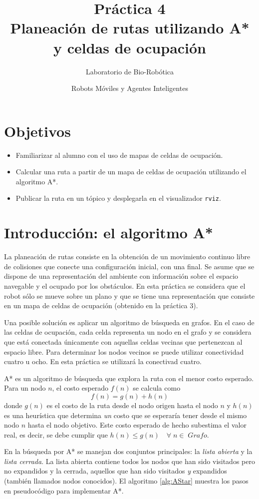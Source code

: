 \documentclass[letterpaper,12pt]{article}
\title{Práctica 4  \\ Planeación de rutas utilizando A* y celdas de ocupación}
\author{Laboratorio de Bio-Robótica}
\date{Robots Móviles y Agentes Inteligentes}
\begin{document}
\renewcommand{\tablename}{Tabla}
\maketitle
\section*{Objetivos}
\begin{itemize}
\item Familiarizar al alumno con el uso de mapas de celdas de ocupación.
\item Calcular una ruta a partir de un mapa de celdas de ocupación utilizando el algoritmo A*.
\item Publicar la ruta en un tópico y desplegarla en el visualizador \texttt{rviz}.
\end{itemize}

\section{Introducción: el algoritmo A*}
La planeación de rutas consiste en la obtención de un movimiento continuo libre de colisiones que conecte una configuración inicial, con una final. Se asume que se dispone de una representación del ambiente con información sobre el espacio navegable y el ocupado por los obstáculos. En esta práctica se considera que el robot sólo se mueve sobre un plano y que se tiene una representación que consiste en un mapa de celdas de ocupación (obtenido en la práctica 3). 

Una posible solución es aplicar un algoritmo de búsqueda en grafos. En el caso de las celdas de ocupación, cada celda representa un nodo en el grafo y se considera que está conectada únicamente con aquellas celdas vecinas que pertenezcan al espacio libre. Para determinar los nodos vecinos se puede utilizar conectividad cuatro u ocho. En esta práctica se utilizará la conectivad cuatro. 

A* es un algoritmo de búsqueda que explora la ruta con el menor costo esperado. Para un nodo $n$, el costo esperado $f(n)$ se calcula como 
\[f(n) = g(n) + h(n)\]
donde $g(n)$ es el costo de la ruta desde el nodo origen hasta el nodo $n$ y $h(n)$ es una heurística que determina \textit{un} costo que se esperaría tener desde el mismo nodo $n$ hasta el nodo objetivo. Este costo esperado de hecho subestima el valor real, es decir, se debe cumplir que $h(n) \leq g(n)\quad \forall\; n \in\; Grafo$. 

En la búsqueda por A* se manejan dos conjuntos principales: la \textit{lista abierta} y la \textit{lista cerrada}. La lista abierta contiene todos los nodos que han sido visitados pero no expandidos y la cerrada, aquellos que han sido visitados \textit{y} expandidos (también llamados nodos conocidos). El algoritmo \ref{alg:AStar} muestra los pasos en pseudocódigo para implementar A*. 
\end{document}
